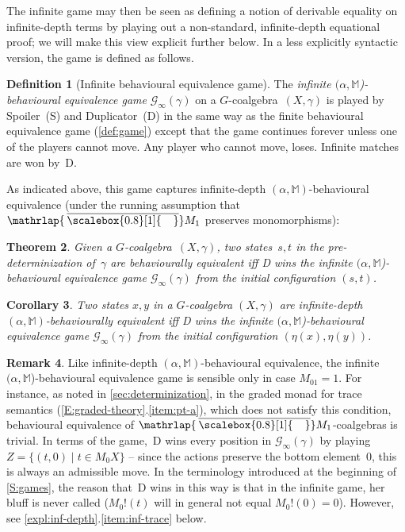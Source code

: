 \documentclass[sigconf,
			final%
			nonacm
                        ]{acmart}
\numberwithin{equation}{section}
\numberwithin{equation}{section}
\theoremstyle{plain}
\newtheorem{thm}{Theorem}[section]
\newtheorem{cor}[thm]{Corollary}
\theoremstyle{definition}
\newtheorem{defn}[thm]{Definition}
\newtheorem{rem}[thm]{Remark}
\newcommand{\mybar}[3]{%
  \mathrlap{\hspace{#2}\overline{\scalebox{#1}[1]{\hphantom{\ensuremath{#3}}\vphantom{\rule{0pt}{5.5pt}}}}}\ensuremath{#3}
}
\newcommand{\barM}{\mybar{0.8}{2pt}{M}_1}
\newcommand{\M}{\mathbb{M}}                   %
\newcommand{\CalG}{\mathcal{G}}             %
\begin{document}
\noindent The infinite game may then be seen as defining a notion of
derivable equality on infinite-depth terms by playing out a
non-standard, infinite-depth equational proof; we will make this view
explicit further below. In a less explicitly syntactic version, the
game is defined as follows.
\begin{defn}[Infinite behavioural equivalence game]
  The \emph{infinite $(\alpha,\M$)-behavioural equivalence game}
  $\CalG_\infty(\gamma)$ on a $G$-coalgebra~$(X,\gamma)$ is played by
  Spoiler~(S) and Duplicator~(D) in the same way as the finite
  behavioural equivalence game (\cref{def:game}) except that the
  game continues forever unless one of the players cannot move. Any
  player who cannot move, loses. Infinite matches are won by~D.
\end{defn}
\noindent As indicated above, this game captures infinite-depth
$(\alpha,\M)$-behavioural equivalence (under the running assumption
that~$\barM$ preserves monomorphisms):
\begin{thm}\label{thm:infinite-depth-games}
  Given a $G$-coalgebra~$(X,\gamma)$, two states~$s,t$ in the
  pre-determinization of~$\gamma$ are behaviourally equivalent iff D
  wins the infinite $(\alpha,\M$)-behavioural equivalence game
  $\CalG_\infty(\gamma)$ from the initial configuration $(s,t)$.
\end{thm}
%
\begin{cor}
  Two states $x,y$ in a $G$-coalgebra $(X,\gamma)$ are infinite-depth
  $(\alpha,\M)$-behaviourally equivalent iff D wins the infinite
  $(\alpha,\M$)-behavioural equivalence game $\CalG_\infty(\gamma)$
  from the initial configuration $(\eta(x),\eta(y))$.
\end{cor}
%
\begin{rem}
  Like infinite-depth $(\alpha,\M)$-behavioural equivalence, the
  infinite $(\alpha,\M$)-behavioural equivalence game is sensible only
  in case $M_01=1$. For instance, as noted in
  \cref{sec:determinization}, in the graded monad for trace
  semantics (\cref{E:graded-theory}.\ref{item:pt-a}), which does not
  satisfy this condition, behavioural equivalence of
  $\barM$-coalgebras is trivial. In terms of the game,~D wins every
  position in $\CalG_\infty(\gamma)$ by playing
  $Z=\{(t,0)\mid t\in M_0X\}$ -- since the actions preserve the bottom
  element~$0$, this is always an admissible move. In the terminology
  introduced at the beginning of \cref{S:games}, the reason that~D
  wins in this way is that in the infinite game, her bluff is never
  called ($M_0!(t)$ will in general not equal $M_0!(0)=0$).  However, see
  \cref{expl:inf-depth}.\ref{item:inf-trace} below.
\end{rem}
\end{document}
